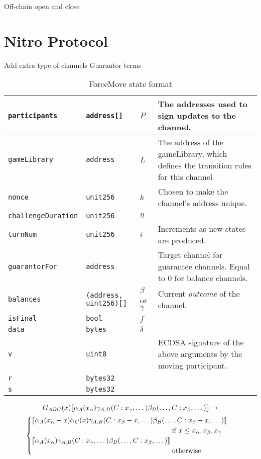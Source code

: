Off-chain open and close


\section{Nitro Protocol}

Add extra type of channels
Guarantor terms

\begin{table}[h]
  \begin{tabular}{|l|l|l|p{5cm}|}
    \hline
    \texttt{participants} & \texttt{address[]} & $P$ & The addresses used to sign updates to the channel. \\ \hline
    \texttt{gameLibrary} & \texttt{address} & $L$ & The address of the gameLibrary, which defines the transition rules for this channel \\ \hline
    \texttt{nonce} & \texttt{unit256} & $k$ & Chosen to make the channel's address unique. \\ \hline
    \texttt{challengeDuration} & \texttt{unit256} & $\eta$ & \\ \hline
    \texttt{turnNum} & \texttt{unit256} & $i$ & Increments as new states are produced. \\ \hline
    \texttt{guarantorFor} & \texttt{address} &  & Target channel for guarantee channels. Equal to 0 for balance channels. \\ \hline
    \texttt{balances} & \texttt{(address, uint256)[]} & $\beta$ or $\gamma$ & Current \textit{outcome} of the channel. \\ \hline
    \texttt{isFinal} & \texttt{bool} & $f$ & \\ \hline
    \texttt{data} & \texttt{bytes} & $\delta$ & \\ \hline
    \texttt{v} & \texttt{uint8} & &  ECDSA signature of the above arguments by the moving participant. \\ \cline{1-2}
    \texttt{r} & \texttt{bytes32} & & \\ \cline{1-2}
    \texttt{s} & \texttt{bytes32} & & \\ \hline
  \end{tabular}
  \caption{ForceMove state format}
  \label{table:force-move-state}
\end{table}

\begin{multline*}
G_{ABC}(x) \adj{\alpha_A(x_\alpha)\gamma_{A,B}(C:x_\gamma, \dots)\beta_B(\dots, C:x_\beta, \dots)} \rightarrow \\
  \begin{cases}
      \adj{\alpha_A(x_\alpha - x)\alpha_C(x)\gamma_{A,B}(C:x_\beta -x, \dots)\beta_B(\dots, C:x_\beta - x, \dots)} \\
      \hspace{7cm} \text{if } x \leq x_\alpha, x_\beta, x_\gamma \\
      \adj{\alpha_A(x_\alpha)\gamma_{A,B}(C:x_\gamma, \dots)\beta_B(\dots, C:x_\beta, \dots)} \\
      \hspace{7cm} \text{otherwise}
  \end{cases}
\end{multline*}

